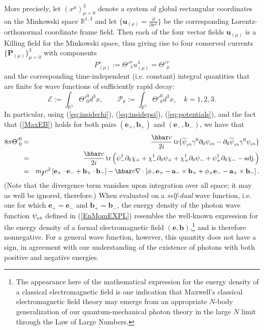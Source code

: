 \documentclass[11pt]{article}
\theoremstyle{definition}
\DeclareMathOperator{\tr}{tr}
\newcommand{\refeq}[1]{(\ref{#1})}
\numberwithin{equation}{section}
\newcommand{\bb}{\mathbf{b}}
\newcommand{\ba}{\mathbf{a}}
\newcommand{\be}{\mathbf{e}}
\newcommand{\bP}{\mathbf{P}}
\newcommand{\bu}{\mathbf{u}}
\newcommand{\beq}{\begin{equation}}
\newcommand{\eeq}{\end{equation}}
\newcommand{\p}{\partial}
\newcommand{\cE}{{\mathcal E}}
\newcommand{\cP}{{\mathcal P}}
\newcommand{\psiPH}{{\psi_{\mbox{\rm\tiny ph}}}}
\newcommand{\psiPHb}{{\overline\psi_{\mbox{\rm\tiny ph}}}}
\newcommand{\mPH}{{m_{\mbox{\Lightning}}}}
\newcommand{\Rset}{{\mathbb R}}
\newcommand{\la}{\lambda}
\newcommand{\ga}{\gamma}
\newcommand{\bna}{\begin{eqnarray}}
\newcommand{\ena}{\end{eqnarray}}
\begin{document}
More precisely, let $(x^\mu)_{\mu=0}^3$ denote a system of global rectangular coordinates on the Minkowski space $\Rset^{1,3}$ and 
let $\{ \bu_{(\mu)} = \frac{\p}{\p x^\mu} \}$ be the corresponding Lorentz-orthonormal coordinate frame field. 
 Then each of the four vector fields $\bu_{(\mu)}$ is a Killing field for the Minkowski space, thus giving rise to four conserved 
currents $\{\bP_{(\mu)}\}_{\mu=0}^3$ with components
\beq
P_{(\mu)}^\nu := \Theta'^\nu_\la u_{(\mu)}^\la = \Theta'^\nu_\mu
\eeq
and the corresponding time-independent (i.e. constant) integral quantities that are finite for wave functions of sufficiently rapid decay:
\beq\label{def:EnMom}
\cE := \int_{\Rset^3} {\Theta'}^0_0 d^3x,\qquad \cP_k := \int_{\Rset^3} {\Theta'}_k^0 d^3x,\quad k = 1,2,3.
\eeq
In particular, using \refeq{eq:insidechi}, \refeq{eq:insidepsi}, \refeq{eq:potentials}, and the fact that \refeq{MaxEB} holds for both 
pairs $(\be_+,\bb_+)$ and $(\be_-,\bb_-)$, we have that
\bna
8\pi {\Theta'}^0_0 & = & \frac{\hbar c}{2i} \tr \{ \psiPHb \ga^0\p_0 \psiPH - \p_0\psiPHb \ga^0 \psiPH \} \nonumber\\
& = & \frac{\hbar c}{2i} \tr\left( \psi_-^\dag \p_0 \chi_+ + \chi_-^\dag \p_0 \psi_+ + \chi_+^\dag \p_0 \psi_- 
+ \psi_+^\dag \p_0 \chi_- - \mbox{adj.}\right) \nonumber\\
& = & {\mPH c^2} \left[ \be_+\cdot \be_- + \bb_+ \cdot \bb_- \right] - 
{\hbar c } \nabla \cdot \left[ \phi_- \be_+ - \ba_- \times \bb_+ +\phi_+\be_- - \ba_+ \times \bb_- \right].
\label{EnMomEXPL}
\ena
 (Note that the divergence term vanishes upon integration over all space; it may as well be ignored, therefore.)
 When evaluated on a {\em self-dual} wave function, i.e. one for which $\be_+ = \be_-$ and $\bb_+ = \bb_-$, 
the energy density of the photon wave function $\psiPH$
defined in \refeq{EnMomEXPL} resembles the well-known expression for the energy density of 
a formal electromagnetic field $(\be,\bb)$,\footnote{The appearance here of the 
   mathematical expression for the energy density of a classical electromagnetic field is one indication that
   Maxwell's classical electromagnetic field theory may emerge from an appropriate $N$-body generalization of our 
   quantum-mechanical photon theory  in the large $N$ limit through the Law of Large Numbers.}
 and is therefore nonnegative.
 For a general wave function, however, this quantity does not have a sign, in agreement with our understanding of the existence 
of photons with both positive and negative energies.
\end{document}
